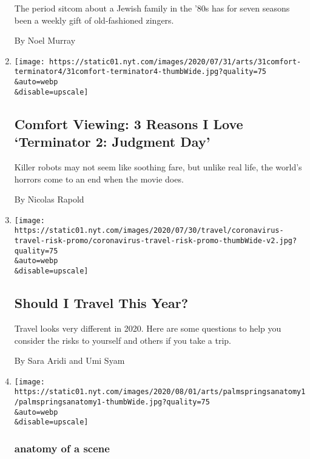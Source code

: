 \begin{enumerate}
  The period sitcom about a Jewish family in the '80s has for seven
  seasons been a weekly gift of old-fashioned zingers.

  By Noel Murray
\item
  \href{/2020/07/31/movies/comfort-viewing-terminator-2.html}{}

  \texttt{[image: https://static01.nyt.com/images/2020/07/31/arts/31comfort-terminator4/31comfort-terminator4-thumbWide.jpg?quality=75\\\&auto=webp\\\&disable=upscale]}

  \hypertarget{comfort-viewing-3-reasons-i-love-terminator-2-judgment-day-1}{%
  \subsection{Comfort Viewing: 3 Reasons I Love `Terminator 2: Judgment
  Day'}\label{comfort-viewing-3-reasons-i-love-terminator-2-judgment-day-1}}

  Killer robots may not seem like soothing fare, but unlike real life,
  the world's horrors come to an end when the movie does.

  By Nicolas Rapold
\item
  \href{/interactive/2020/07/31/travel/coronavirus-travel-risk.html}{}

  \texttt{[image: https://static01.nyt.com/images/2020/07/30/travel/coronavirus-travel-risk-promo/coronavirus-travel-risk-promo-thumbWide-v2.jpg?quality=75\\\&auto=webp\\\&disable=upscale]}

  \hypertarget{should-i-travel-this-year-1}{%
  \subsection{Should I Travel This
  Year?}\label{should-i-travel-this-year-1}}

  Travel looks very different in 2020. Here are some questions to help
  you consider the risks to yourself and others if you take a trip.

  By Sara Aridi and Umi Syam
\item
  \href{/2020/07/31/movies/palm-springs-clip-hulu.html}{}

  \texttt{[image: https://static01.nyt.com/images/2020/08/01/arts/palmspringsanatomy1/palmspringsanatomy1-thumbWide.jpg?quality=75\\\&auto=webp\\\&disable=upscale]}

  \hypertarget{anatomy-of-a-scene}{%
  \subsubsection{anatomy of a scene}\label{anatomy-of-a-scene}}


\end{enumerate}
